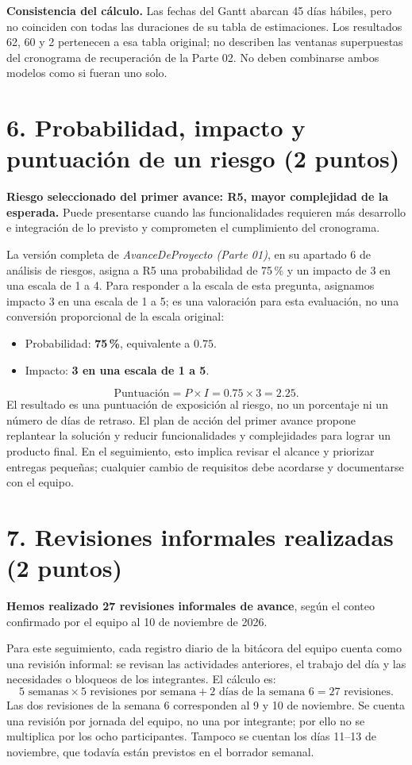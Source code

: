 \documentclass[11pt,letterpaper]{article}
\begin{document}
\textbf{Consistencia del cálculo.} Las fechas del Gantt abarcan 45 días
hábiles, pero no coinciden con todas las duraciones de su tabla de
estimaciones. Los resultados 62, 60 y 2 pertenecen a esa tabla original;
no describen las ventanas superpuestas del cronograma de recuperación de la
Parte 02. No deben combinarse ambos modelos como si fueran uno solo.

\section*{6. Probabilidad, impacto y puntuación de un riesgo (2 puntos)}
\textbf{Riesgo seleccionado del primer avance: R5, mayor complejidad de la
esperada.} Puede presentarse cuando las funcionalidades requieren más
desarrollo e integración de lo previsto y comprometen el cumplimiento del
cronograma.

La versión completa de \textit{AvanceDeProyecto (Parte 01)}, en su apartado
6 de análisis de riesgos, asigna a R5 una probabilidad de 75\,\% y un impacto
de 3 en una escala de 1 a 4. Para responder a la escala de esta pregunta,
asignamos impacto 3 en una escala de 1 a 5; es una valoración para esta
evaluación, no una conversión proporcional de la escala original:
\begin{itemize}
\item Probabilidad: \textbf{75\,\%}, equivalente a $0.75$.
\item Impacto: \textbf{3 en una escala de 1 a 5}.
\end{itemize}
\[
\text{Puntuación}=P\times I=0.75\times3=\boxed{2.25}.
\]
El resultado es una puntuación de exposición al riesgo, no un porcentaje ni
un número de días de retraso. El plan de acción del primer avance propone
replantear la solución y reducir funcionalidades y complejidades para lograr
un producto final. En el seguimiento, esto implica revisar el alcance y
priorizar entregas pequeñas; cualquier cambio de requisitos debe acordarse
y documentarse con el equipo.

\section*{7. Revisiones informales realizadas (2 puntos)}
\textbf{Hemos realizado 27 revisiones informales de avance}, según el conteo
confirmado por el equipo al 10 de noviembre de 2026.

Para este seguimiento, cada registro diario de la bitácora del equipo cuenta
como una revisión informal: se revisan las actividades anteriores, el trabajo
del día y las necesidades o bloqueos de los integrantes. El cálculo es:
\[
5\text{ semanas}\times5\text{ revisiones por semana}
+2\text{ días de la semana 6}=\boxed{27\text{ revisiones}}.
\]
Las dos revisiones de la semana 6 corresponden al 9 y 10 de noviembre. Se
cuenta una revisión por jornada del equipo, no una por integrante; por ello
no se multiplica por los ocho participantes. Tampoco se cuentan los días
11--13 de noviembre, que todavía están previstos en el borrador semanal.
\end{document}
